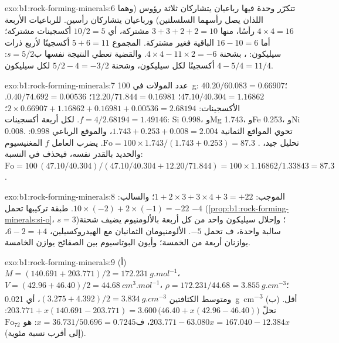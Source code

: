 \begin{solution}{exo:b1:rock-forming-minerals:6}
تتكرّر وحدة فيها رباعيان يتشاركان ثلاثة رؤوس (وهما اللذان يصل رأسهما السلسلتين) ورباعيان يتشاركان رأسين. للرباعيات الأربعة $4\times4 = 16$ رأسًا، منها $3 + 3 + 2 + 2 = 10$ مشتركة، أي $10/2 = 5$ أكسجينات مشتركة؛ أما $16 - 10 = 6$ الباقية فغير مشتركة. المجموع $5 + 6 = 11$ أكسجينًا لأربع ذرات سيليكون: ، بشحنة $4\times4 - 11\times2 = -6$. والقضية تعطي النتيجة نفسها ب$s = 5/2$: $4 - 5/4 = 11/4$ أكسجينًا لكل سيليكون، وشحنة $5/2 - 4 = -3/2$ لكل سيليكون.
\end{solution}

\begin{solution}{exo:b1:rock-forming-minerals:7}
عدد المولات في \qty{100}{g}:  $40.20/60.083 = 0.66907$؛ 
$47.10/40.304 = 1.16862$؛  $12.20/71.844 = 0.16981$؛ 
$0.40/74.692 = 0.00536$. الأكسجينات: $2\times0.66907 + 1.16862 + 0.16981 +
0.00536 = 2.68194$؛ $f = 4/2.68194 = 1.49146$. لكل أربعة أكسجينات: Si
\num{0.998}، وMg \num{1.743}، وFe \num{0.253}، وNi \num{0.008}. تحوي المواقع
الثمانية $1.743 + 0.253 + 0.008 = 2.004$، والموقع الرباعي
\num{0.998}: تحليل جيد، .
$\mathrm{Fo} = 100\times1.743/(1.743 + 0.253) = 87.3$. يضرب العامل $f$ المغنيسيوم والحديد بالقدر نفسه، فيحذف في النسبة:
$\mathrm{Fo} = 100\,(47.10/40.304)/(47.10/40.304 + 12.20/71.844) =
100\times1.16862/1.33843 = 87.3$.
\end{solution}

\begin{solution}{exo:b1:rock-forming-minerals:8}
الموجب: $1 + 2\times3 + 3\times4 + 3 = +22$؛ والسالب:
$10\times(-2) + 2\times(-1) = -22$. طبقة تركيبها  تحمل $-4$ (\cref{prop:b1:rock-forming-minerals:si-o}، $s = 3$)؛ وإحلال سيليكون واحد من كل أربعة بالألومنيوم يضيف شحنة سالبة واحدة، ف تحمل $-5$. الألومنيومان الثمانيان مع الهيدروكسيلين، $6 - 2 = +4$، يوازنان أربعة من الخمسة؛ وأيون البوتاسيوم بين الصفائح يوازن الخامسة.
\end{solution}

\begin{solution}{exo:b1:rock-forming-minerals:9}
(أ) $M = (140.691 + 203.771)/2 = \qty{172.231}{g.mol^{-1}}$، $V = (42.96 +
46.40)/2 = \qty{44.68}{cm^3.mol^{-1}}$، $\rho = 172.231/44.68 =
\qty{3.855}{g.cm^{-3}}$؛ ومتوسط الكثافتين $(3.275 + 4.392)/2 =
\qty{3.834}{g.cm^{-3}}$، أي \qty{0.021}{g.cm^{-3}} أقل. (ب) نحلّ
$203.771 + x(140.691 - 203.771) = 3.600\,\bigl(46.40 + x(42.96 - 46.40)\bigr)$:
$203.771 - 63.080x = 167.040 - 12.384x$، ف$x = 36.731/50.696 = 0.7245$:  هو $\text{Fo}_{72}$ (إلى أقرب نسبة مئوية).
\end{solution}

